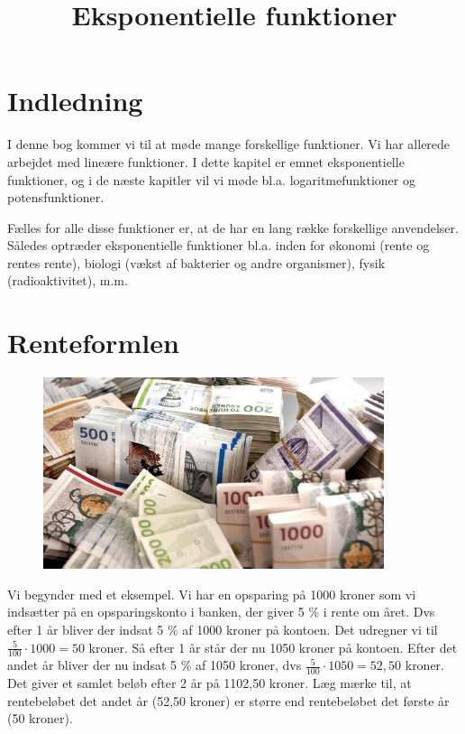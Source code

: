 \documentclass[12pt,oneside,a4paper]{article}
\title{Eksponentielle funktioner}
\date{\vspace{-5ex}}
\theoremstyle{plain}
\begin{document}
\maketitle

\section*{Indledning}
I denne bog kommer vi til at møde mange forskellige funktioner. Vi har allerede
arbejdet med lineære funktioner. I dette kapitel er emnet eksponentielle
funktioner, og i de næste kapitler vil vi møde bl.a. logaritmefunktioner og
potensfunktioner.

Fælles for alle disse funktioner er, at de har en lang række forskellige
anvendelser. Således optræder eksponentielle funktioner bl.a. inden for økonomi
(rente og rentes rente), biologi (vækst af bakterier og andre organismer),
fysik (radioaktivitet), m.m.

\section*{Renteformlen}
\begin{figure}[ht]
    \centering
    \includegraphics[width=10cm]{penge}
\end{figure}

Vi begynder med et eksempel. Vi har en opsparing på 1000 kroner som vi
indsætter på en opsparingskonto i banken, der giver 5 \% i rente om året. Dvs
efter 1 år bliver der indsat 5 \% af 1000 kroner på kontoen. Det
udregner vi til $ \frac{5}{100} \cdot 1000 = 50 $ kroner. Så efter 1 år står
der nu 1050 kroner på kontoen.  Efter det andet år bliver der nu indsat 5 \% af
1050 kroner, dvs $ \frac{5}{100} \cdot 1050 = 52,50$ kroner.
Det giver et samlet beløb efter 2 år på 1102,50 kroner. Læg mærke til, at
rentebeløbet det andet år (52,50 kroner) er større end rentebeløbet det første
år (50 kroner).
\end{document}
